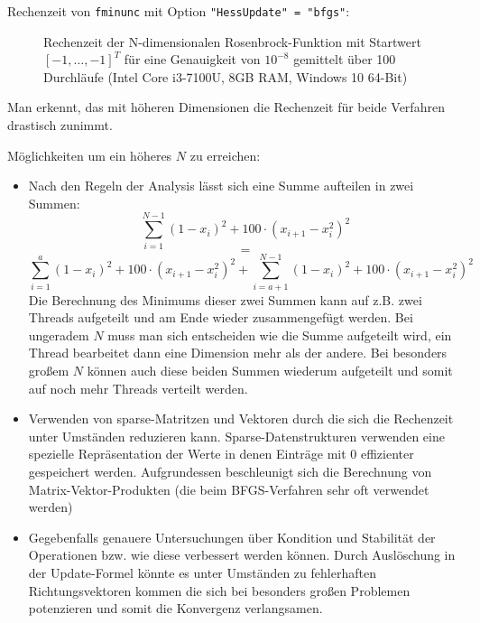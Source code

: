 \documentclass[a4paper, 12pt]{report}
\begin{document}
Rechenzeit von \lstinline[basicstyle=\ttfamily\color{black}]|fminunc| mit Option
\lstinline[basicstyle=\ttfamily\color{black}]|"HessUpdate" = "bfgs"|:

\begin{figure}[H]
  \centering
\caption{Rechenzeit der N-dimensionalen Rosenbrock-Funktion mit Startwert $[-1, \ldots, -1]^T$ für
  eine Genauigkeit von $10^{-8}$ gemittelt über 100 Durchläufe (Intel Core i3-7100U, 8GB RAM, Windows 10 64-Bit)}
\end{figure}

Man erkennt, das mit höheren Dimensionen die Rechenzeit für beide Verfahren drastisch zunimmt.\par

Möglichkeiten um ein höheres $N$ zu erreichen:
\begin{itemize}
  \item Nach den Regeln der Analysis lässt sich eine Summe aufteilen in zwei Summen:
  $$\sum_{i=1}^{N-1}(1 - x_i)^2 + 100\cdot(x_{i+1}-x_i^2)^2$$
  $$=$$
  $$\sum_{i=1}^{a}(1 - x_i)^2 + 100\cdot(x_{i+1}-x_i^2)^2 + \sum_{i=a+1}^{N-1}(1 - x_i)^2 + 100\cdot(x_{i+1}-x_i^2)^2$$
  Die Berechnung des Minimums dieser zwei Summen kann auf z.B. zwei Threads aufgeteilt und am Ende wieder zusammengefügt werden.
  Bei ungeradem $N$ muss man sich entscheiden wie die Summe aufgeteilt wird, ein Thread bearbeitet dann eine Dimension mehr als der andere.
  Bei besonders großem $N$ können auch diese beiden Summen wiederum aufgeteilt und somit auf noch mehr Threads verteilt werden.
  \item Verwenden von sparse-Matritzen und Vektoren durch die sich die Rechenzeit unter Umständen reduzieren kann. Sparse-Datenstrukturen
  verwenden eine spezielle Repräsentation der Werte in denen Einträge mit $0$ effizienter gespeichert werden. Aufgrundessen beschleunigt
  sich die Berechnung von Matrix-Vektor-Produkten (die beim BFGS-Verfahren sehr oft verwendet werden)
  \item Gegebenfalls genauere Untersuchungen über Kondition und Stabilität der Operationen bzw. wie diese verbessert werden können.
  Durch Auslöschung in der Update-Formel könnte es unter Umständen zu fehlerhaften Richtungsvektoren kommen die sich bei besonders
  großen Problemen potenzieren und somit die Konvergenz verlangsamen.
\end{itemize}
\end{document}
